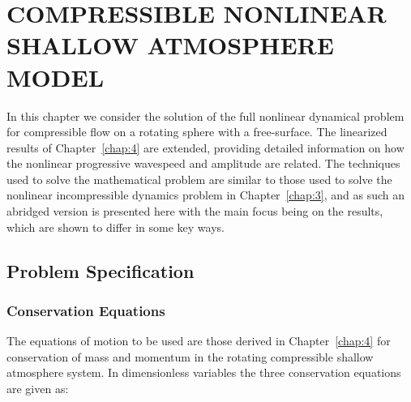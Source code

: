 
\chapter[COMPRESSIBLE NONLINEAR SHALLOW ATMOSPHERE\\ MODEL]{COMPRESSIBLE NONLINEAR SHALLOW ATMOSPHERE MODEL}
\label{chap:5}

In this chapter we consider the solution of the full nonlinear dynamical problem for compressible flow on a rotating sphere with a free-surface. The linearized results of Chapter~\ref{chap:4} are extended, providing detailed information on how the nonlinear progressive wavespeed and amplitude are related. The techniques used to solve the mathematical problem are similar to those used to solve the nonlinear incompressible dynamics problem in Chapter~\ref{chap:3}, and as such an abridged version is presented here with the main focus being on the results, which are shown to differ in some key ways. 

\section{Problem Specification}
\subsection{Conservation Equations}
The equations of motion to be used are those derived in Chapter~\ref{chap:4} for conservation of mass and momentum in the rotating compressible shallow atmosphere system. In dimensionless variables the three conservation equations are given as:

